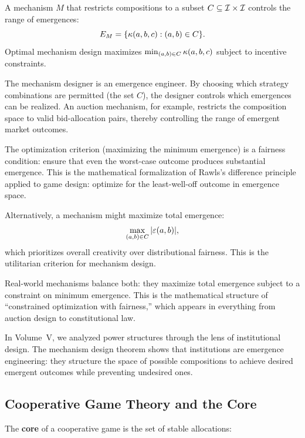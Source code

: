 \begin{theorem}
\label{thm:mechanism-design}
A mechanism $M$ that restricts compositions to a subset $C \subseteq \mathcal{I} \times \mathcal{I}$
controls the range of emergences:
\[
  E_M = \{\kappa(a,b,c) : (a,b) \in C\}.
\]
Optimal mechanism design maximizes $\min_{(a,b) \in C} \kappa(a,b,c)$ subject
to incentive constraints.
\end{theorem}

\begin{interpretation}
The mechanism designer is an emergence engineer. By choosing which strategy
combinations are permitted (the set $C$), the designer controls which emergences
can be realized. An auction mechanism, for example, restricts the composition
space to valid bid-allocation pairs, thereby controlling the range of emergent
market outcomes.

The optimization criterion (maximizing the minimum emergence) is a fairness
condition: ensure that even the worst-case outcome produces substantial emergence.
This is the mathematical formalization of Rawls's difference principle applied
to game design: optimize for the least-well-off outcome in emergence space.

Alternatively, a mechanism might maximize total emergence:
\[
  \max_{(a,b) \in C} |\varepsilon(a,b)|,
\]
which prioritizes overall creativity over distributional fairness. This is the
utilitarian criterion for mechanism design.

Real-world mechanisms balance both: they maximize total emergence subject to a
constraint on minimum emergence. This is the mathematical structure of
``constrained optimization with fairness,'' which appears in everything from
auction design to constitutional law.

In Volume~V, we analyzed power structures through the lens of institutional
design. The mechanism design theorem shows that institutions are emergence
engineering: they structure the space of possible compositions to achieve desired
emergent outcomes while preventing undesired ones.

\end{interpretation}

\subsection{Cooperative Game Theory and the Core}

The \textbf{core} of a cooperative game is the set of stable allocations:

